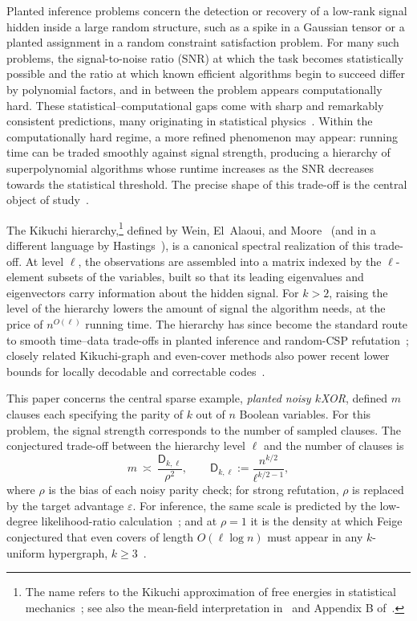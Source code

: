 \documentclass[11pt]{article}
\theoremstyle{definition}
\theoremstyle{remark}
\newcommand{\1}{\mathbf 1}
\newcommand{\eps}{\varepsilon}
\newcommand{\Dkl}{\mathsf D_{k,\ell}}
\numberwithin{equation}{section}
\begin{document}
Planted inference problems concern the detection or recovery of a low-rank signal hidden inside a large random
structure, such as a spike in a Gaussian tensor or a planted assignment in a random
constraint satisfaction problem.  For many such problems, the signal-to-noise ratio (SNR) at which the
task becomes statistically possible and the ratio  at which known
efficient algorithms begin to succeed differ by polynomial factors, and
in between the problem appears computationally hard.  These
statistical--computational gaps come with sharp and remarkably
consistent predictions, many originating in statistical
physics~\cite{ZK,BPW}.  Within the computationally hard regime,
a more refined phenomenon may appear: running time can be traded smoothly
against signal strength, producing a hierarchy of superpolynomial algorithms whose runtime increases as the SNR decreases towards the statistical threshold.  The precise shape of this trade-off is the central object of study~\cite{WEM,KWB}.

The Kikuchi hierarchy,\footnote{The name refers to the Kikuchi
approximation of free energies in statistical
mechanics~\cite{Kikuchi1951}; see also the mean-field interpretation
in~\cite{Hastings2019} and Appendix B of~\cite{SOKB}.} defined by
Wein, El~Alaoui, and Moore~\cite{WEM} (and in a different
language by
Hastings~\cite{Hastings2019}), is a canonical spectral realization of
this trade-off.  At level $\ell$, the observations are assembled into a
matrix indexed by the $\ell$-element subsets of the variables, built so
that its leading eigenvalues and eigenvectors carry information about
the hidden signal.  For $k>2$, raising the level of the hierarchy lowers the amount of
signal the algorithm needs, at the price of $n^{O(\ell)}$ running time.
The hierarchy has since become the standard route to smooth time--data
trade-offs in planted inference and random-CSP
refutation~\cite{GKM,HKM,HKMMS,SOKB,SZ}; closely related Kikuchi-graph
and even-cover methods also power recent lower bounds for locally
decodable and correctable codes~\cite{AGKM,KothariManohar}.

This paper concerns the central sparse example, \emph{planted noisy $k$XOR}, defined
$m$ clauses each specifying the parity of $k$ out of $n$ Boolean variables.  For this problem, the signal strength corresponds to the number of sampled clauses. The
conjectured trade-off between the hierarchy level $\ell$ and the number of clauses is
\begin{equation}\label{eq:scale}
 m\ \asymp\ \frac{\Dkl}{\rho^2},
 \qquad
 \Dkl:=\frac{n^{k/2}}{\ell^{k/2-1}},
\end{equation}
where $\rho$ is the bias of each noisy parity check; for strong
refutation, $\rho$ is replaced by the
target advantage $\eps$.  For inference, the same scale is predicted by the
low-degree likelihood-ratio calculation~\cite{HopkinsSteurer,KWB}; and
at $\rho=1$ it is the density at which Feige conjectured that even
covers of length $O(\ell\log n)$ must appear in any $k$-uniform
hypergraph, $k\ge3$~\cite{Feige}.
\end{document}
